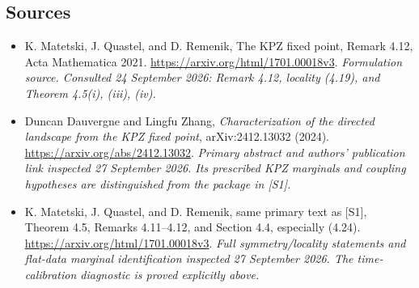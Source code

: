 \documentclass[11pt]{article}
\begin{document}
\subsection{Sources}
\begin{itemize}
\item[S1]K. Matetski, J. Quastel, and D. Remenik, The KPZ fixed point, Remark 4.12, Acta Mathematica 2021.
\url{https://arxiv.org/html/1701.00018v3}.
\textit{Formulation source. Consulted 24 September 2026: Remark 4.12, locality (4.19), and Theorem 4.5(i), (iii), (iv).}
\item[E1]Duncan Dauvergne and Lingfu Zhang,
\emph{Characterization of the directed landscape from the KPZ fixed point},
arXiv:2412.13032 (2024).
\url{https://arxiv.org/abs/2412.13032}.
\textit{Primary abstract and authors' publication link inspected
27 September 2026. Its prescribed KPZ marginals and coupling hypotheses
are distinguished from the package in [S1].}
\item[E2]K. Matetski, J. Quastel, and D. Remenik, same primary text as [S1],
Theorem 4.5, Remarks 4.11--4.12, and Section 4.4, especially (4.24).
\url{https://arxiv.org/html/1701.00018v3}.
\textit{Full symmetry/locality statements and flat-data marginal
identification inspected 27 September 2026. The time-calibration
diagnostic is proved explicitly above.}

\end{itemize}
\end{document}
